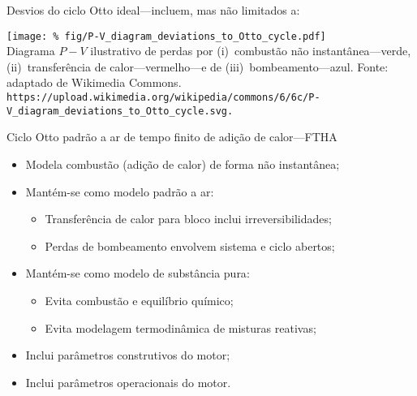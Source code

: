     \begin{frame}{Desvios do ciclo Otto ideal---incluem, mas não limitados a:}\vspace*{-2em}
        \begin{center}
            \texttt{[image: \%
                fig/P-V\_diagram\_deviations\_to\_Otto\_cycle.pdf]}\\
            \footnotesize  Diagrama  $P-V$  ilustrativo  de   perdas   por   (i)~combustão   não
                instantânea---verde,    (ii)~transferência    de     calor---vermelho---e     de
                (iii)~bombeamento---azul. Fonte: adaptado de Wikimedia Commons.
            {\tiny\tt https://upload.wikimedia.org/wikipedia/commons/6/6c/P-V\_diagram\_deviations\_to\_Otto\_cycle.svg.}
        \end{center}
    \end{frame}

    \begin{frame}{Ciclo Otto padrão a ar de tempo finito de adição de calor---FTHA}\vspace*{-2em}
        \begin{itemize}
            \item<1->  Modela combustão (adição de calor) de forma \alert{não instantânea};
            \item<2->  Mantém-se como modelo \alert{padrão a ar}:
            \begin{itemize}
                \item<3->  Transferência de calor para bloco inclui \alert{irreversibilidades};
                \item<4->  Perdas de bombeamento envolvem \alert{sistema e ciclo abertos};
            \end{itemize}
            \item<5->  Mantém-se como modelo de \alert{substância pura}:
            \begin{itemize}
                \item<6->  Evita \alert{combustão e equilíbrio químico};
                \item<7->  Evita modelagem termodinâmica de \alert{misturas reativas};
            \end{itemize}
            \item<8->  Inclui parâmetros \alert{construtivos} do \alert{motor};
            \item<9->  Inclui parâmetros \alert{operacionais} do \alert{motor}.
        \end{itemize}
    \end{frame}

